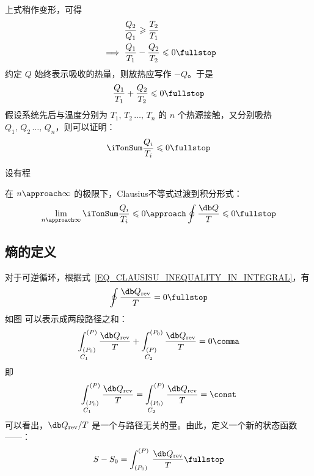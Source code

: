     上式稍作变形，可得
    \begin{align}
      &\mathrel{\phantom{\implies}} \frac{Q_2}{Q_1} \geqslant \frac{T_2}{T_1} \\
      &\implies \frac{Q_1}{T_1} - \frac{Q_2}{T_2} \leqslant 0 \fullstop
    \end{align}
    约定 $Q$ 始终表示吸收的热量，则放热应写作 $-Q$。于是
    \begin{equation}
      \frac{Q_1}{T_1} + \frac{Q_2}{T_2} \leqslant 0 \fullstop
    \end{equation}
    假设系统先后与温度分别为 $T_1, \, T_2 \, \dots, \, T_n$ 的 $n$ 个热源接触，又分别吸热 $Q_1, \, Q_2 \, \dots, \, Q_n$，则可以证明：
    \begin{equation}
      \iTonSum \frac{Q_i}{T_i} \leqslant 0 \fullstop
    \end{equation}
    
    \begin{myProof}
      设有程%
    \end{myProof}
    
    在 $n \approach \infty$ 的极限下，Clausius不等式过渡到积分形式：
    \begin{equation} \label{EQ_CLAUSISU_INEQUALITY_IN_INTEGRAL}
      \lim\limits_{n \approach \infty} \iTonSum \frac{Q_i}{T_i} \leqslant 0 \approach \oint \frac{\db Q}{T} \leqslant 0 \fullstop
    \end{equation}
    
  \subsection{熵的定义}
    对于可逆循环，根据式~\eqref{EQ_CLAUSISU_INEQUALITY_IN_INTEGRAL}，有
    \begin{equation}
      \oint \frac{\db Q_\text{rev}}{T} = 0 \fullstop
    \end{equation}
    如图%
    可以表示成两段路径之和：
    \begin{equation}
      \underset{C_1\phantom{M}}{\int_{(P_0)}^{(P)}} \, \frac{\db Q_\text{rev}}{T}
      + \underset{C_2\phantom{M}}{\int_{(P)}^{(P_0)}} \, \frac{\db Q_\text{rev}}{T} = 0 \comma
    \end{equation}
    即
    \begin{equation}
      \underset{C_1\phantom{M}}{\int_{(P_0)}^{(P)}} \, \frac{\db Q_\text{rev}}{T}
      = \underset{C_2\phantom{M}}{\int_{(P_0)}^{(P)}} \, \frac{\db Q_\text{rev}}{T} = \const
    \end{equation}
    可以看出，$\db Q_\text{rev} / T$ 是一个与路径无关的量。由此，定义一个新的状态函数——：
    \begin{equation}
      S - S_0 = \int_{(P_0)}^{(P)} \, \frac{\db Q_\text{rev}}{T} \fullstop
    \end{equation}
    

